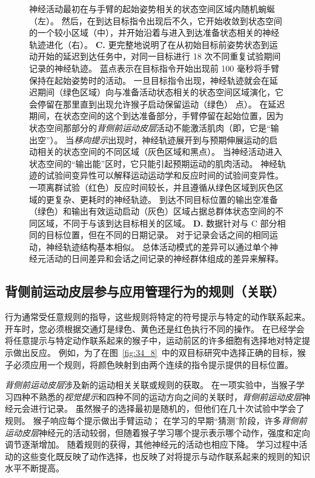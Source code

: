 \begin{figure}[htbp]
{		神经活动最初在与手臂的起始姿势相关的状态空间区域内随机蜿蜒（左）。
		然后，在到达目标指令出现后不久，它开始收敛到状态空间的一个较小区域（中），并开始沿着与进入到达准备状态相关的神经轨迹进化（右）。
		\textbf{C.} 更完整地说明了在从初始目标前姿势状态到运动开始的延迟到达任务中，对同一目标进行 18 次不同重复试验期间记录的神经轨迹。
		蓝点表示在目标指令开始出现前 100 毫秒将手臂保持在起始姿势时的活动。
		一旦目标指令出现，神经轨迹就会在延迟期间（绿色区域）向与准备活动状态相关的状态空间区域演化，它会停留在那里直到出现允许猴子启动保留运动（绿色） 点）。
		在延迟期间，在状态空间的这个到达准备部分，手臂停留在起始位置，因为状态空间那部分的\textit{背侧前运动皮层}活动不能激活肌肉（即，它是“输出空”）。
		当\textit{移向提示}出现时，神经轨迹展开到与预期伸展运动的启动相关的状态空间的不同区域（灰色区域和黑点）。
		当神经活动进入状态空间的“输出能”区时，它只能引起预期运动的肌肉活动。
		神经轨迹的试验间变异性可以解释运动运动学和反应时间的试验间变异性。
		一项离群试验（红色）反应时间较长，并且遵循从绿色区域到灰色区域的更复杂、更耗时的神经轨迹。
		到达不同目标位置的输出空准备（绿色）和输出有效运动启动（灰色）区域占据总群体状态空间的不同区域，不同于与该到达目标相关的区域。
		\textbf{D.} 数据针对与 C 部分相同的目标位置，但在不同的日期记录。
		对于记录会话之间的相同运动，神经轨迹结构基本相似。
		总体活动模式的差异可以通过单个神经元活动的日间差异和会话之间记录的神经群体组成的差异来解释。}
	\label{fig:34_10}
\end{figure}



\subsection{背侧前运动皮层参与应用管理行为的规则（关联）}

行为通常受任意规则的指导，这些规则将特定的符号提示与特定的动作联系起来。
开车时，您必须根据交通灯是绿色、黄色还是红色执行不同的操作。
在已经学会将任意提示与特定动作联系起来的猴子中，运动前区的许多细胞有选择地对特定提示做出反应。
例如，为了在图~\ref{fig:34_8}~中的双目标研究中选择正确的目标，猴子必须应用一个规则，将颜色映射到由两个连续的指令提示提供的目标位置。


\textit{背侧前运动皮层}涉及新的运动相关关联或规则的获取。
在一项实验中，当猴子学习四种不熟悉的\textit{视觉提示}和四种不同的运动方向之间的关联时，\textit{背侧前运动皮层}神经元会进行记录。
虽然猴子的选择最初是随机的，但他们在几十次试验中学会了规则。
猴子响应每个提示做出手臂运动；
在学习的早期“猜测”阶段，许多\textit{背侧前运动皮层}神经元的活动较弱，但随着猴子学习哪个提示表示哪个动作，强度和定向调节逐渐增加。
随着规则的获得，其他神经元的活动也相应下降。
学习过程中活动的这些变化既反映了动作选择，也反映了对将提示与动作联系起来的规则的知识水平不断提高。


